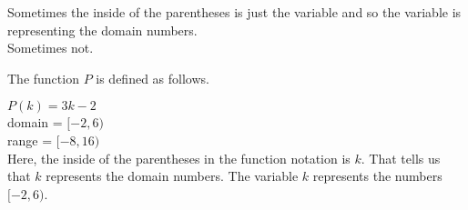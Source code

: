 \documentclass{ximera}
\begin{document}
Sometimes the inside of the parentheses is just the variable and so the variable is representing the domain numbers. \\

Sometimes not. \\


\begin{example}

The function $P$ is defined as follows.

$P(k) = 3k - 2$ \\
domain = $[-2, 6)$ \\
range = $[-8, 16)$ \\


Here, the inside of the parentheses in the function notation is $k$.  That tells us that $k$ represents the domain numbers.  The variable $k$ represents the numbers $[-2, 6)$.


\end{example}
\end{document}
